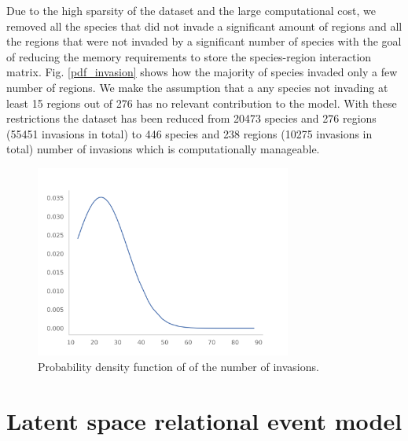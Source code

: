 \documentclass[mscthesis]{usiinfthesis}
\begin{document}
Due to the high sparsity of the dataset and the large computational cost, we removed all the species that did not invade a significant amount of regions and all the regions that were not invaded by a significant number of species with the goal of reducing the memory requirements to store the species-region interaction matrix. Fig. \ref{pdf_invasion} shows how the majority of species invaded only a few number of regions. We make the assumption that a any species not invading at least 15 regions out of 276 has no relevant contribution to the model. With these restrictions the dataset has been reduced from 20473 species and 276 regions (55451 invasions in total) to 446 species and 238 regions (10275 invasions in total) number of invasions which is computationally manageable. 

\begin{figure}[H]
    \centering
    \includegraphics[width=0.75\textwidth]{species_region_invasion_filtering.png}
    \caption{Probability density function of of the number of invasions.}
    \label{fig:pdf_invasion_filtered}
\end{figure}


\section{Latent space relational event model}
%
%
%
\end{document}
